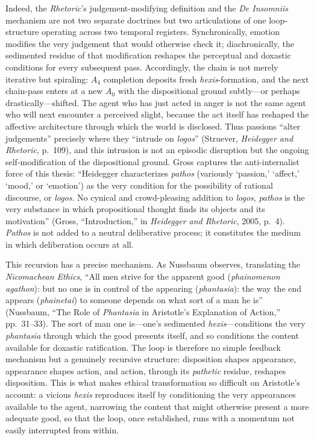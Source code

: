 \documentclass{article}
\begin{document}
Indeed, the \textit{Rhetoric}'s judgement-modifying definition and the \textit{De Insomniis} mechanism are not two separate doctrines but two articulations of one loop-structure operating across two temporal registers. Synchronically, emotion modifies the very judgement that would otherwise check it; diachronically, the sedimented residue of that modification reshapes the perceptual and doxastic conditions for every subsequent pass. Accordingly, the chain is not merely iterative but spiraling: $A_4$ completion deposits fresh \textit{hexis}-formation, and the next chain-pass enters at a new $A_0$ with the dispositional ground subtly---or perhaps drastically---shifted. The agent who has just acted in anger is not the same agent who will next encounter a perceived slight, because the act itself has reshaped the affective architecture through which the world is disclosed. Thus passions ``alter judgements'' precisely where they ``intrude on \textit{logos}'' (Struever, \textit{Heidegger and Rhetoric}, p.~109), and this intrusion is not an episodic disruption but the ongoing self-modification of the dispositional ground. Gross captures the anti-internalist force of this thesis: ``Heidegger characterizes \textit{pathos} (variously `passion,' `affect,' `mood,' or `emotion') as the very condition for the possibility of rational discourse, or \textit{logos}. No cynical and crowd-pleasing addition to \textit{logos}, \textit{pathos} is the very substance in which propositional thought finds its objects and its motivation'' (Gross, ``Introduction,'' in \textit{Heidegger and Rhetoric}, 2005, p.~4). \textit{Pathos} is not added to a neutral deliberative process; it constitutes the medium in which deliberation occurs at all.

This recursion has a precise mechanism. As Nussbaum observes, translating the \textit{Nicomachean Ethics}, ``All men strive for the apparent good (\textit{phainomenon agathon}): but no one is in control of the appearing (\textit{phantasia}): the way the end appears (\textit{phainetai}) to someone depends on what sort of a man he is'' (Nussbaum, ``The Role of \textit{Phantasia} in Aristotle's Explanation of Action,'' pp.~31--33). The sort of man one is---one's sedimented \textit{hexis}---conditions the very \textit{phantasia} through which the good presents itself, and so conditions the content available for doxastic ratification. The loop is therefore no simple feedback mechanism but a genuinely recursive structure: disposition shapes appearance, appearance shapes action, and action, through its \textit{pathetic} residue, reshapes disposition. This is what makes ethical transformation so difficult on Aristotle's account: a vicious \textit{hexis} reproduces itself by conditioning the very appearances available to the agent, narrowing the content that might otherwise present a more adequate good, so that the loop, once established, runs with a momentum not easily interrupted from within.
\end{document}
